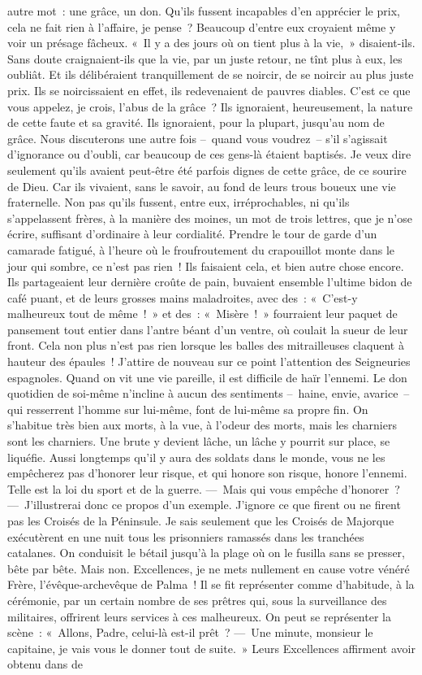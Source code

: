 \documentclass[french,twoside]{book} %
\begin{document}
autre mot : une grâce, un don. Qu’ils fussent incapables d’en apprécier le prix, cela ne fait rien à l’affaire, je pense ? Beaucoup d’entre eux croyaient même y voir un présage fâcheux. « Il y a des jours où on tient plus à la vie, » disaient-ils. Sans doute craignaient-ils que la vie, par un juste retour, ne tînt plus à eux, les oubliât. Et ils délibéraient tranquillement de se noircir, de se noircir au plus juste prix. Ils se noircissaient en effet, ils redevenaient de pauvres diables. C’est ce que vous appelez, je crois, l’abus de la grâce ? Ils ignoraient, heureusement, la nature de cette faute et sa gravité. Ils ignoraient, pour la plupart, jusqu’au nom de grâce. Nous discuterons une autre fois – quand vous voudrez – s’il s’agissait d’ignorance ou d’oubli, car beaucoup de ces gens-là étaient baptisés. Je veux dire seulement qu’ils avaient peut-être été parfois dignes de cette grâce, de ce sourire de Dieu. Car ils vivaient, sans le savoir, au fond de leurs trous boueux une vie fraternelle. Non pas qu’ils fussent, entre eux, irréprochables, ni qu’ils s’appelassent frères, à la manière des moines, un mot de trois lettres, que je n’ose écrire, suffisant d’ordinaire à leur cordialité. Prendre le tour de garde d’un camarade fatigué, à l’heure où le froufroutement du crapouillot monte dans le jour qui sombre, ce n’est pas rien ! Ils faisaient cela, et bien autre chose encore. Ils partageaient leur dernière croûte de pain, buvaient ensemble l’ultime bidon de café puant, et de leurs grosses mains maladroites, avec des : « C’est-y malheureux tout de même ! » et des : « Misère ! » fourraient leur paquet de pansement tout entier dans l’antre béant d’un ventre, où coulait la sueur de leur front. Cela non plus n’est pas rien lorsque les balles des mitrailleuses claquent à hauteur des épaules ! J’attire de nouveau sur ce point l’attention des Seigneuries espagnoles. Quand on vit une vie pareille, il est difficile de haïr l’ennemi. Le don quotidien de soi-même n’incline à aucun des sentiments – haine, envie, avarice – qui resserrent l’homme sur lui-même, font de lui-même sa propre fin. On s’habitue très bien aux morts, à la vue, à l’odeur des morts, mais les charniers sont les charniers. Une brute y devient lâche, un lâche y pourrit sur place, se liquéfie. Aussi longtemps qu’il y aura des soldats dans le monde, vous ne les empêcherez pas d’honorer leur risque, et qui honore son risque, honore l’ennemi. Telle est la loi du sport et de la guerre. — Mais qui vous empêche d’honorer ? — J’illustrerai donc ce propos d’un exemple. J’ignore ce que firent ou ne firent pas les Croisés de la Péninsule. Je sais seulement que les Croisés de Majorque exécutèrent en une nuit tous les prisonniers ramassés dans les tranchées catalanes. On conduisit le bétail jusqu’à la plage où on le fusilla sans se presser, bête par bête. Mais non. Excellences, je ne mets nullement en cause votre vénéré Frère, l’évêque-archevêque de Palma ! Il se fit représenter comme d’habitude, à la cérémonie, par un certain nombre de ses prêtres qui, sous la surveillance des militaires, offrirent leurs services à ces malheureux. On peut se représenter la scène : « Allons, Padre, celui-là est-il prêt ? — Une minute, monsieur le capitaine, je vais vous le donner tout de suite. » Leurs Excellences affirment avoir obtenu dans de 
\end{document}
